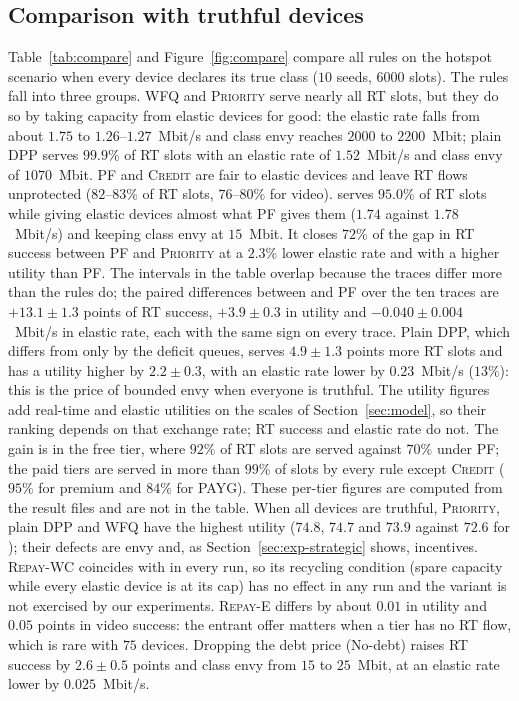 \subsection{Comparison with truthful devices}\label{sec:exp-compare}

Table~\ref{tab:compare} and Figure~\ref{fig:compare} compare all rules on the hotspot scenario when every device declares its true class ($10$ seeds, $6000$ slots).
The rules fall into three groups.
\textsc{WFQ} and \textsc{Priority} serve nearly all RT slots, but they do so by taking capacity from elastic devices for good: the elastic rate falls from about $1.75$ to $1.26$--$1.27$~Mbit/s and class envy reaches $2000$ to $2200$~Mbit; plain DPP serves $99.9\%$ of RT slots with an elastic rate of $1.52$~Mbit/s and class envy of $1070$~Mbit.
\textsc{PF} and \textsc{Credit} are fair to elastic devices and leave RT flows unprotected ($82$--$83\%$ of RT slots, $76$--$80\%$ for video).
\repay{} serves $95.0\%$ of RT slots while giving elastic devices almost what \textsc{PF} gives them ($1.74$ against $1.78$~Mbit/s) and keeping class envy at $15$~Mbit.
It closes $72\%$ of the gap in RT success between \textsc{PF} and \textsc{Priority} at a $2.3\%$ lower elastic rate and with a higher utility than \textsc{PF}.
The intervals in the table overlap because the traces differ more than the rules do; the paired differences between \repay{} and \textsc{PF} over the ten traces are $+13.1\pm1.3$ points of RT success, $+3.9\pm0.3$ in utility and $-0.040\pm0.004$~Mbit/s in elastic rate, each with the same sign on every trace.
Plain DPP, which differs from \repay{} only by the deficit queues, serves $4.9\pm1.3$ points more RT slots and has a utility higher by $2.2\pm0.3$, with an elastic rate lower by $0.23$~Mbit/s ($13\%$): this is the price of bounded envy when everyone is truthful.
The utility figures add real-time and elastic utilities on the scales of Section~\ref{sec:model}, so their ranking depends on that exchange rate; RT success and elastic rate do not.
The gain is in the free tier, where $92\%$ of RT slots are served against $70\%$ under \textsc{PF}; the paid tiers are served in more than $99\%$ of slots by every rule except \textsc{Credit} ($95\%$ for premium and $84\%$ for PAYG). These per-tier figures are computed from the result files and are not in the table.
When all devices are truthful, \textsc{Priority}, plain DPP and \textsc{WFQ} have the highest utility ($74.8$, $74.7$ and $73.9$ against $72.6$ for \repay{}); their defects are envy and, as Section~\ref{sec:exp-strategic} shows, incentives.
\textsc{Repay-WC} coincides with \repay{} in every run, so its recycling condition (spare capacity while every elastic device is at its cap) has no effect in any run and the variant is not exercised by our experiments. \textsc{Repay-E} differs by about $0.01$ in utility and $0.05$ points in video success: the entrant offer matters when a tier has no RT flow, which is rare with $75$ devices.
Dropping the debt price (No-debt) raises RT success by $2.6\pm0.5$ points and class envy from $15$ to $25$~Mbit, at an elastic rate lower by $0.025$~Mbit/s.

